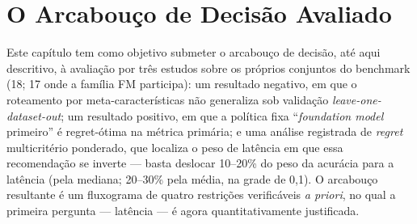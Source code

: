 
\chapter{O Arcabouço de Decisão Avaliado}
\label{chap:framework}

Este capítulo tem como objetivo submeter o arcabouço de decisão,
até aqui descritivo, à avaliação por três estudos sobre os próprios
conjuntos do benchmark (18; 17 onde a família FM participa): um resultado negativo, em que o
roteamento por meta-características não generaliza sob validação
\emph{leave-one-dataset-out}; um resultado positivo, em que a política
fixa ``\emph{foundation model} primeiro'' é regret-ótima na métrica
primária; e uma análise registrada de \emph{regret} multicritério
ponderado, que localiza o peso de latência em que essa recomendação se
inverte --- basta deslocar 10--20\% do peso da acurácia para a
latência (pela mediana; 20--30\% pela média, na grade de 0,1).
O arcabouço resultante é um fluxograma de quatro restrições verificáveis
\emph{a priori}, no qual a primeira pergunta --- latência --- é agora
quantitativamente justificada.

